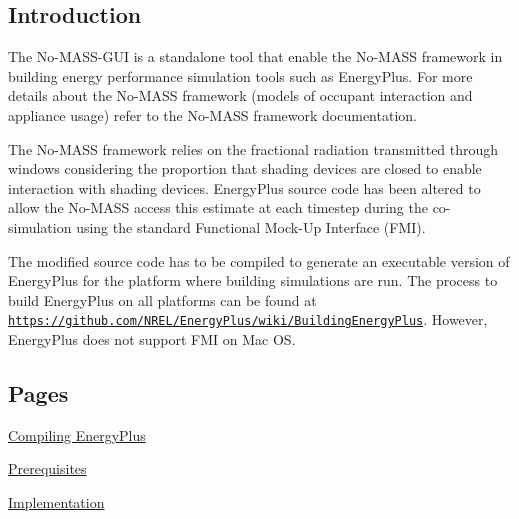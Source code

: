  

\subsection*{Introduction}



The No-\/\+M\+A\+S\+S-\/\+G\+UI is a standalone tool that enable the No-\/\+M\+A\+SS framework in building energy performance simulation tools such as Energy\+Plus. For more details about the No-\/\+M\+A\+SS framework (models of occupant interaction and appliance usage) refer to the No-\/\+M\+A\+SS framework documentation.

The No-\/\+M\+A\+SS framework relies on the fractional radiation transmitted through windows considering the proportion that shading devices are closed to enable interaction with shading devices. Energy\+Plus source code has been altered to allow the No-\/\+M\+A\+SS access this estimate at each timestep during the co-\/simulation using the standard Functional Mock-\/\+Up Interface (F\+MI).

The modified source code has to be compiled to generate an executable version of Energy\+Plus for the platform where building simulations are run. The process to build Energy\+Plus on all platforms can be found at \href{https://github.com/NREL/EnergyPlus/wiki/BuildingEnergyPlus}{\tt https\+://github.\+com/\+N\+R\+E\+L/\+Energy\+Plus/wiki/\+Building\+Energy\+Plus}. However, Energy\+Plus does not support F\+MI on Mac OS.

 

\subsection*{Pages}


\begin{DoxyItemize}
\item \hyperlink{CompilingEnergyPlus}{Compiling Energy\+Plus}
\item \hyperlink{Prerequisites}{Prerequisites}
\item \hyperlink{Implementation}{Implementation} 
\end{DoxyItemize}